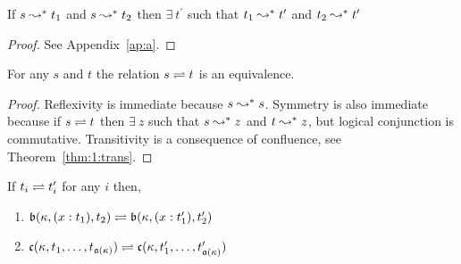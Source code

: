 \begin{lemma}[Confluence]
    If $s \leadsto^* t_1$ and $s \leadsto^* t_2$ then $\exists\ t^\prime$ such that $t_1 \leadsto^* t^\prime$ and $t_2 \leadsto^* t^\prime$
\end{lemma}
\begin{proof}
    See Appendix~\ref{ap:a}.
\end{proof}

\begin{lemma}
    For any $s$ and $t$ the relation $s \rightleftharpoons t$ is an equivalence.
    \label{lem:2:beta_conv_equivalence}
\end{lemma}
\begin{proof}
    Reflexivity is immediate because $s \leadsto^* s$.
    Symmetry is also immediate because if $s \rightleftharpoons t$ then $\exists\ z$ such that $s \leadsto^* z$ and $t \leadsto^* z$, but logical conjunction is commutative.
    Transitivity is a consequence of confluence, see Theorem~\ref{thm:1:trans}.
\end{proof}

\begin{corollary}
    If $t_i \rightleftharpoons t_i^\prime$ for any $i$ then,
    \begin{enumerate}
        \item $\mathfrak{b}(\kappa, (x : t_1), t_2) \rightleftharpoons \mathfrak{b}(\kappa, (x : t_1^\prime), t_2^\prime)$
        \item $\mathfrak{c}(\kappa, t_1,\ldots,t_{\mathfrak{a}(\kappa)}) \rightleftharpoons \mathfrak{c}(\kappa, t_1^\prime,\ldots,t_{\mathfrak{a}(\kappa)}^\prime)$
    \end{enumerate}
    \label{cor:2:conv_congr}
\end{corollary}





